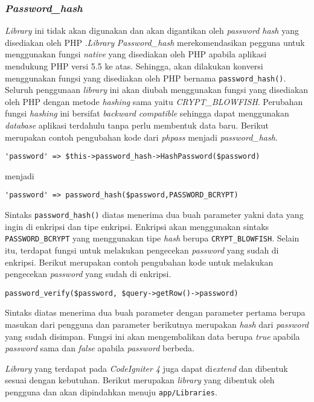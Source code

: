 \subsubsection{\textit{Password\_hash}}
\textit{Library} ini tidak akan digunakan dan akan digantikan oleh \textit{password hash} yang disediakan oleh PHP .\textit{Library} \textit{Password\_hash} merekomendasikan pegguna untuk menggunakan fungsi \textit{native} yang disediakan oleh PHP apabila aplikasi mendukung PHP versi 5.5 ke atas. Sehingga, akan dilakukan konversi menggunakan fungsi yang disediakan oleh PHP bernama \texttt{password\_hash()}. Seluruh penggunaan \textit{library} ini akan diubah menggunakan fungsi yang disediakan oleh PHP dengan metode \textit{hashing} sama yaitu \textit{CRYPT\_BLOWFISH}. Perubahan fungsi \textit{hashing} ini bersifat \textit{backward compatible} sehingga dapat menggunakan \textit{database} aplikasi terdahulu tanpa perlu membentuk data baru. Berikut merupakan contoh pengubahan kode dari \textit{phpass} menjadi \textit{password\_hash}.

\begin{center}
\verb|'password' => $this->password_hash->HashPassword($password)|
\end{center}
menjadi
\begin{center}
\verb|'password' => password_hash($password,PASSWORD_BCRYPT)|
\end{center}

Sintaks \texttt{password\_hash()} diatas menerima dua buah parameter yakni data yang ingin di enkripsi dan tipe enkripsi. Enkripsi akan menggunakan sintaks \texttt{PASSWORD\_BCRYPT} yang menggunakan tipe \textit{hash} berupa \texttt{CRYPT\_BLOWFISH}. Selain itu, terdapat fungsi untuk melakukan pengecekan \textit{password} yang sudah di enkripsi. Berikut merupakan contoh pengubahan kode untuk melakukan pengecekan \textit{password} yang sudah di enkripsi.
\begin{center}
\verb|password_verify($password, $query->getRow()->password)|
\end{center}
Sintaks diatas menerima dua buah parameter dengan parameter pertama berupa masukan dari pengguna dan parameter berikutnya merupakan \textit{hash} dari \textit{password} yang sudah disimpan. Fungsi ini akan mengembalikan data berupa \textit{true} apabila \textit{password} sama dan \textit{false} apabila \textit{password} berbeda.

\textit{Library} yang terdapat pada \textit{CodeIgniter 4} juga dapat di\textit{extend} dan dibentuk sesuai dengan kebutuhan. Berikut merupakan \textit{library} yang dibentuk oleh pengguna dan akan dipindahkan menuju \texttt{app/Libraries}.

